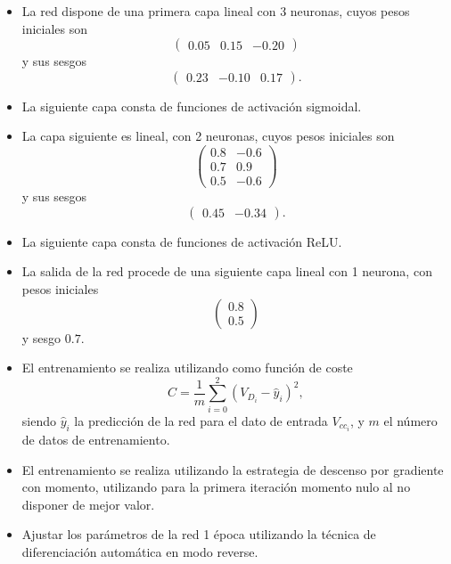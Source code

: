 \documentclass[paper=a4, fontsize=11pt]{scrartcl} %
\numberwithin{equation}{section} %
\numberwithin{figure}{section} %
\numberwithin{table}{section} %
\begin{document}
\begin{itemize}
    \item La red dispone de una primera capa lineal con 3 neuronas, cuyos pesos iniciales son 
    \[
    \begin{pmatrix}
        0.05 & 0.15 & -0.20 
    \end{pmatrix}
    \]
    y sus sesgos 
    \[
    \begin{pmatrix}
        0.23 & -0.10 & 0.17 
    \end{pmatrix}.
    \]
    
    \item La siguiente capa consta de funciones de activación sigmoidal.
    
    \item La capa siguiente es lineal, con 2 neuronas, cuyos pesos iniciales son 
    \[
    \begin{pmatrix}
        0.8 & -0.6 \\
        0.7 & 0.9 \\
        0.5 & -0.6 
    \end{pmatrix}
    \]
    y sus sesgos 
    \[
    \begin{pmatrix}
        0.45 & -0.34 
    \end{pmatrix}.
    \]
    
    \item La siguiente capa consta de funciones de activación ReLU.
    
    \item La salida de la red procede de una siguiente capa lineal con 1 neurona, con pesos iniciales 
    \[
    \begin{pmatrix}
        0.8 \\
        0.5 
    \end{pmatrix}
    \]
    y sesgo \( 0.7 \).
    
    \item El entrenamiento se realiza utilizando como función de coste 
    \[
    C = \frac{1}{m} \sum_{i=0}^{2} (V_{D_i} - \hat{y}_i)^2,
    \]
    siendo \( \hat{y}_i \) la predicción de la red para el dato de entrada \( V_{cc_i} \), y \( m \) el número de datos de entrenamiento.
    
    \item El entrenamiento se realiza utilizando la estrategia de descenso por gradiente con momento, utilizando para la primera iteración momento nulo al no disponer de mejor valor.
    
    \item Ajustar los parámetros de la red 1 época utilizando la técnica de diferenciación automática en modo reverse.
    

\end{itemize}
\end{document}
